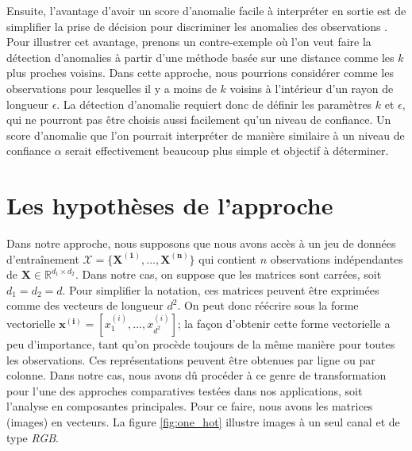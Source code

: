 Ensuite, l'avantage d'avoir un score d'anomalie facile à interpréter en sortie est de simplifier la prise de décision pour discriminer les anomalies des observations \DIFdelbegin {}\DIFdelend \DIFaddbegin {}\DIFaddend . Pour illustrer cet avantage, prenons un contre-exemple où l'on veut faire la détection d'anomalies à partir d'une méthode basée sur une distance comme les $k$ plus proches voisins. Dans cette approche, nous pourrions considérer comme \DIFdelbegin {}\DIFdelend \DIFaddbegin {}\DIFaddend les observations pour lesquelles il y a moins de $k$ voisins à l'intérieur d'un rayon de longueur $\epsilon$. La détection d'anomalie requiert donc de définir les paramètres $k$ et $\epsilon$, qui ne pourront pas être choisis aussi facilement qu'un niveau de confiance. Un score d'anomalie que l'on pourrait interpréter de manière similaire à un niveau de confiance $\alpha$ serait effectivement beaucoup plus simple et objectif à déterminer.

\section{Les hypothèses de l'approche}

Dans notre approche, nous supposons que  nous avons accès à un jeu de données d'entraînement $\mathcal{X} = \{\boldsymbol{X^{(1)}}, ..., \boldsymbol{X^{(n)}}\}$ qui contient $n$ observations indépendantes de $\mathbf{X} \in \mathbb{R}^{d_1 \times d_2}$. Dans notre cas, on suppose que les matrices sont carrées, soit $d_1=d_2=d$. Pour simplifier la notation, ces matrices peuvent être exprimées comme des vecteurs de longueur $d^2$. On peut donc réécrire sous la forme vectorielle $\boldsymbol{x^{(i)}} = [x^{(i)}_1,...,x^{(i)}_{d^2}]$; la façon d'obtenir cette forme vectorielle a peu d'importance, tant qu'on procède toujours de la même manière pour toutes les observations. Ces représentations peuvent être obtenues par ligne ou par colonne. Dans notre cas, nous avons dû procéder à ce genre de transformation pour l'une des approches comparatives testées dans nos applications, soit l'analyse en composantes principales\DIFdelbegin {}\DIFdelend . Pour ce faire, nous avons \DIFdelbegin {}\DIFdelend \DIFaddbegin {}\DIFaddend les matrices (images) en vecteurs. La figure \ref{fig:one_hot} illustre \DIFdelbegin {}\DIFdelend \DIFaddbegin {}\DIFaddend images à un seul canal et \DIFdelbegin {}\DIFdelend \DIFaddbegin {}\DIFaddend de type \textit{RGB}.

